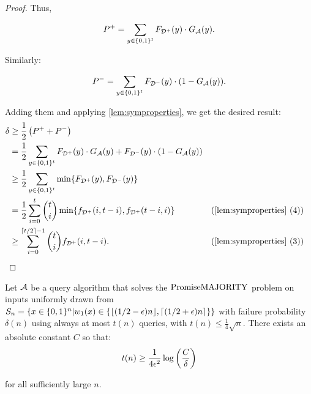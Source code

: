 \begin{proof}
Thus, 

$$
P^+ = \sum_{y \in \{0, 1\}^t} F_{\mathcal{D}^+}(y) \cdot G_{\mathcal{A}}(y).
$$

Similarly:

$$
P^- = \sum_{y \in \{0, 1\}^t} F_{\mathcal{D}^-}(y) \cdot (1-G_{\mathcal{A}}(y)).
$$

Adding them and applying \cref{lem:symproperties}, we get the desired result:
\begin{align*}
\delta & \geq \frac{1}{2}\left(P^+ + P^-\right) \\
        & = \frac{1}{2}\sum_{y \in \{0, 1\}^t} F_{\D^+}(y) \cdot G_\A(y) + F_{\D^-}(y) \cdot (1-G_\A(y)) \\ 
        & \geq \frac{1}{2}\sum_{y \in \{0, 1\}^t} \min \{F_{\D^+}(y), F_{\D^-}(y)\} \\
        & = \frac{1}{2}\sum_{i=0}^{t} \binom{t}{i} \min \{f_{\D^+}(i, t-i), f_{\D^+}(t-i, i)\} 
        && (\text{\cref{lem:symproperties} (4)})\\
        & \geq \sum_{i=0}^{\lceil t/2 \rceil-1} \binom{t}{i} f_{\D^+}(i, t-i).
        && (\text{\cref{lem:symproperties} (3)})
\end{align*}

\end{proof}

\begin{theorem}
\label{thm:querylb}
Let $\mathcal{A}$ be a query algorithm that solves the $\mathrm{PromiseMAJORITY}$ problem on inputs uniformly drawn from 
$S_n = \{x \in \{0, 1\}^n | w_1(x) \in \{\lfloor(1/2-\epsilon)n\rfloor, \lceil(1/2+\epsilon)n\rceil\}\}$ 
with failure probability $\delta(n)$ using always at most $t(n)$ queries, with $t(n) \leq \frac{1}{4}\sqrt{n}$. 
There exists an absolute constant $C$ so that: 
$$
t(n) \geq \frac{1}{4\epsilon^2} \log \left(\frac{C}{\delta}\right)
$$

for all sufficiently large $n$.
\end{theorem}

